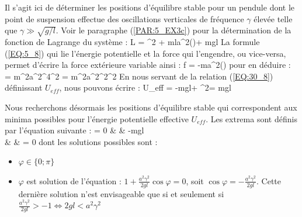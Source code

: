 Il s'agit ici de d\'{e}terminer les positions d'\'{e}quilibre stable pour un pendule dont le point de suspension effectue des oscillations verticales de fr\'{e}quence $\gamma$ \'{e}lev\'{e}e telle que $\gamma \gg \sqrt{g/l}$. Voir le paragraphe (\ref{PAR:5_EX3c}) pour la d\'{e}termination de la fonction de Lagrange du syst\`{e}me :
\benn
	L = \dot{\varphi}^{2} + mla\gamma^{2}\cos(\gamma{})\cos\varphi + mgl\sin\varphi
\eenn
La formule (\ref{EQ:5_8}) qui lie l'\'{e}nergie potentielle et la force qui l'engendre, ou vice-versa, permet d'\'{e}crire la force ext\'{e}rieure variable ainsi :
\benn
	f = -ma\gamma^{2}\cos(\gamma{})\sin\varphi
\eenn
pour en d\'{e}duire :
\benn
	 = m^{2}a^{2}\gamma^{4}\sin^{2}\varphi{} = m^{2}a^{2}\gamma^{2}\sin^{2}\varphi
\eenn
En nous servant de la relation (\ref{EQ:30_8}) d\'{e}finissant $U_{eff}$, nous pouvons \'{e}crire :
\benn
	U_{eff} = -mgl\cos\varphi + \sin^{2}\varphi = mgl
\eenn

Nous recherchons d\'{e}sormais les positions d'\'{e}quilibre stable qui correspondent aux minima possibles pour l'\'{e}nergie potentielle effective $U_{eff}$. Les extrema sont d\'{e}finis par l'\'{e}quation suivante :
\bea
	 = 0 & \Leftrightarrow & -mgl \nonumber \\
	& \Leftrightarrow & \sin\varphi{} = 0 \nonumber
\eea
dont les solutions possibles sont :
\begin{itemize}
	\item $\varphi \in \{0;\pi\}$
	\item $\varphi$ est solution de l'\'{e}quation : $1 + \frac{a^{2}\gamma^{2}}{2gl}\cos\varphi = 0$, soit $\cos\varphi = -\frac{a^{2}\gamma^{2}}{2gl}$. Cette derni\`{e}re solution n'est envisageable que si et seulement si $\frac{a^{2}\gamma^{2}}{2gl} > -1 \Leftrightarrow 2gl < a^{2}\gamma^{2}$
\end{itemize}

